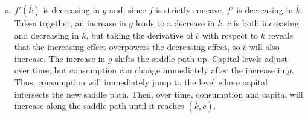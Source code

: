 \documentclass{article}
\begin{document}
\begin{enumerate}[(a)]
	\item $f'(\overline{k})$ is decreasing in $g$ and, since $f$ is strictly concave, $f'$ is decreasing in $\overline{k}$. Taken together, an increase in $g$ leads to a decrease in $\overline{k}$. $\overline{c}$ is both increasing and decreasing in $\overline{k}$, but taking the derivative of $\overline{c}$ with respect to $\overline{k}$ reveals that the increasing effect overpowers the decreasing effect, so $\overline{c}$ will also increase. The increase in $g$ shifts the saddle path up. Capital levels adjust over time, but consumption can change immediately after the increase in $g$. Thus, consumption will immediately jump to the level where capital intersects the new saddle path. Then, over time, consumption and capital will increase along the saddle path until it reaches $(\overline{k},\overline{c})$.
	
\end{enumerate}

\end{document}
